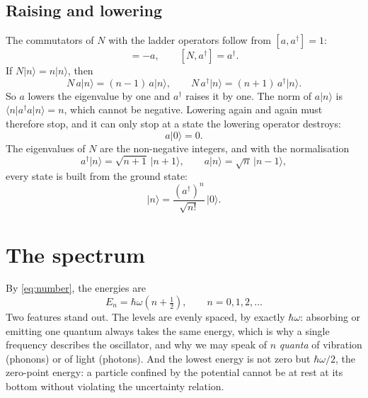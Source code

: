 \documentclass[10pt,twocolumn]{article}
\newcommand{\ad}{a^\dagger}
\newcommand{\ket}[1]{\lvert #1\rangle}
\newcommand{\bra}[1]{\langle #1\rvert}
\begin{document}
\subsection{Raising and lowering}

The commutators of $N$ with the ladder operators follow from $[a,\ad]=1$:
\begin{equation}
  [N,a] = -a, \qquad [N,\ad] = \ad .
\end{equation}
If $N\ket{n} = n\ket{n}$, then
\begin{equation}
  N\,a\ket{n} = (n-1)\,a\ket{n}, \qquad N\,\ad\ket{n} = (n+1)\,\ad\ket{n}.
\end{equation}
So $a$ lowers the eigenvalue by one and $\ad$ raises it by one. The norm
of $a\ket{n}$ is $\bra{n}\ad a\ket{n} = n$, which cannot be negative.
Lowering again and again must therefore stop, and it can only stop at a
state the lowering operator destroys:
\begin{equation}
  a\ket{0} = 0 .
  \label{eq:ground}
\end{equation}
The eigenvalues of $N$ are the non-negative integers, and with the
normalisation
\begin{equation}
  \ad\ket{n} = \sqrt{n+1}\,\ket{n+1}, \qquad a\ket{n} = \sqrt{n}\,\ket{n-1},
\end{equation}
every state is built from the ground state:
\begin{equation}
  \ket{n} = \frac{(\ad)^n}{\sqrt{n!}}\,\ket{0}.
\end{equation}

\section{The spectrum}

By \eqref{eq:number}, the energies are
\begin{equation}
  E_n = \hbar\omega\left(n+\tfrac12\right), \qquad n = 0,1,2,\dots
  \label{eq:spectrum}
\end{equation}
Two features stand out. The levels are evenly spaced, by exactly
$\hbar\omega$: absorbing or emitting one quantum always takes the same
energy, which is why a single frequency describes the oscillator, and why
we may speak of $n$ \emph{quanta} of vibration (phonons) or of light
(photons). And the lowest energy is not zero but $\hbar\omega/2$, the
zero-point energy: a particle confined by the potential cannot be at rest
at its bottom without violating the uncertainty relation.
\end{document}
